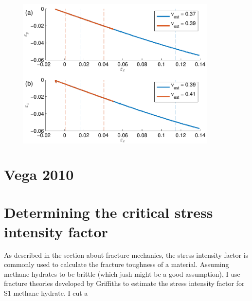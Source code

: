 \begin{figure}
\includegraphics[width=10cm]{../figures/thesis/strain_strain_11_11_11_y_z_poisson_tip4p_ice_uam.pdf}
\end{figure}

\section{Vega 2010}
\section{Determining the critical stress intensity factor}
As described in the section about fracture mechanics, the stress intensity factor is commonly used to calculate the fracture toughness of a material. Assuming methane hydrates to be brittle (which jush might be a good assumption), I use fracture theories developed by Griffiths to estimate the stress intensity factor for S1 methane hydrate. I cut a 

